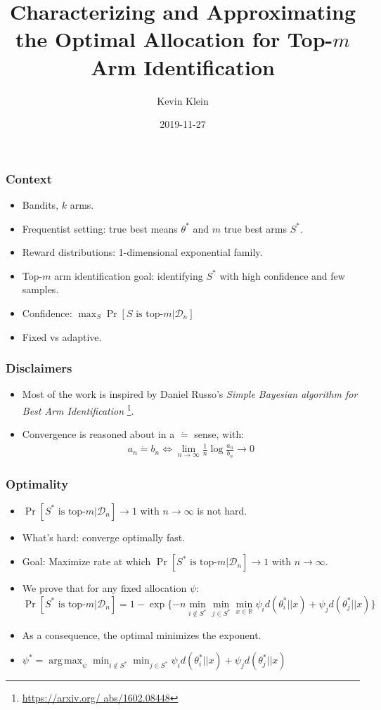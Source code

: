 \documentclass[aspectratio=43]{beamer}
\author{Kevin Klein}
\title{Characterizing and Approximating the Optimal Allocation for Top-$m$ Arm
    Identification}
\date{2019-11-27}
\DeclareMathOperator*{\argmax}{arg\,max}
\newcommand{\deq}{\dot{=}}
\begin{document}
\titleframe

\begin{frame}
\frametitle{Context}
\begin{itemize}
  \item Bandits, $k$ arms.
  \item Frequentist setting: true best means $\theta^*$ and $m$ true best arms
      $S^*$.
  \item Reward distributions: 1-dimensional exponential family.
  \item Top-$m$ arm identification goal: identifying $S^*$ with high confidence and few samples.
  \item Confidence: $\max_{S} \Pr[S \text{ is top-}m | \mathcal{D}_n]$
  \item Fixed vs adaptive.
\end{itemize}
\end{frame}

\begin{frame}
\frametitle{Disclaimers}
\begin{itemize}
  \item Most of the work is inspired by Daniel Russo's \emph{Simple Bayesian
      algorithm for Best Arm Identification} \footnote{\url{https://arxiv.org/
      abs/1602.08448}}.
  \item Convergence is reasoned about in a $\deq$ sense, with:
\begin{align}
  a_n \deq b_n \Leftrightarrow \lim_{n \rightarrow
  \infty}\frac{1}{n}\log{\frac{a_n}{b_n}} \rightarrow 0
\end{align}
\end{itemize}
\end{frame}

\begin{frame}
\frametitle{Optimality}
\begin{itemize}
  \item $\Pr[S^* \text{ is top-}m | \mathcal{D}_n] \rightarrow 1$ with $n
      \rightarrow \infty$ is not hard.
  \item What's hard: converge optimally fast.
  \item Goal: Maximize rate at which $\Pr[S^* \text{ is top-}m |
      \mathcal{D}_n] \rightarrow 1$ with $n \rightarrow \infty$.
  \item We prove that for any fixed allocation $\psi$:
  \[\Pr[S^* \text{ is top-}m |
      \mathcal{D}_n] = 1 - \exp\{-n \min_{i \notin S^*} \min_{j \in S^*} \min_{x \in \mathbb{R}} \psi_i d(\theta^*_i || x) + \psi_j d(\theta^*_j || x) \}\]
  \item As a consequence, the optimal minimizes the exponent.
  \item $\psi^* = \argmax_{\psi} \min_{i \notin S^*}\min_{j \in S^*} \psi_i
      d(\theta^*_i || x) + \psi_j d(\theta^*_j || x)$
\end{itemize}
\end{frame}
\end{document}
